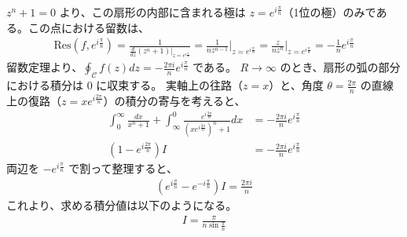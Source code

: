 \documentclass[platex,dvipdfmx,a4paper]{jsarticle}
\begin{document}
  $z^n+1 = 0$ より、この扇形の内部に含まれる極は $z = e^{i\frac{\pi}{n}}$（1位の極）のみである。この点における留数は、
  \begin{align*}
  \text{Res}(f, e^{i\frac{\pi}{n}}) = \frac{1}{\frac{d}{dz}(z^n+1)\big|_{z=e^{i\frac{\pi}{n}}}} = \frac{1}{n z^{n-1}}\Big|_{z=e^{i\frac{\pi}{n}}} = \frac{z}{n z^n}\Big|_{z=e^{i\frac{\pi}{n}}} = -\frac{1}{n} e^{i\frac{\pi}{n}}
  \end{align*}
  留数定理より、$\oint_{\mathcal{C}} f(z) dz = -\frac{2\pi i}{n} e^{i\frac{\pi}{n}}$ である。
  $R \to \infty$ のとき、扇形の弧の部分における積分は $0$ に収束する。
  実軸上の往路（$z=x$）と、角度 $\theta = \frac{2\pi}{n}$ の直線上の復路（$z = x e^{i\frac{2\pi}{n}}$）の積分の寄与を考えると、
  \begin{align*}
  \int_{0}^{\infty} \frac{dx}{x^n+1} + \int_{\infty}^{0} \frac{e^{i\frac{2\pi}{n}}}{ (x e^{i\frac{2\pi}{n}})^n + 1 } dx &= -\frac{2\pi i}{n} e^{i\frac{\pi}{n}} \\
  (1 - e^{i\frac{2\pi}{n}}) I &= -\frac{2\pi i}{n} e^{i\frac{\pi}{n}}
  \end{align*}
  両辺を $-e^{i\frac{\pi}{n}}$ で割って整理すると、
  \begin{align*}
  (e^{i\frac{\pi}{n}} - e^{-i\frac{\pi}{n}}) I = \frac{2\pi i}{n}
  \end{align*}
  これより、求める積分値は以下のようになる。
  \begin{align*}
  I = \frac{\pi}{n \sin \frac{\pi}{n}}
  \end{align*}
\end{document}
